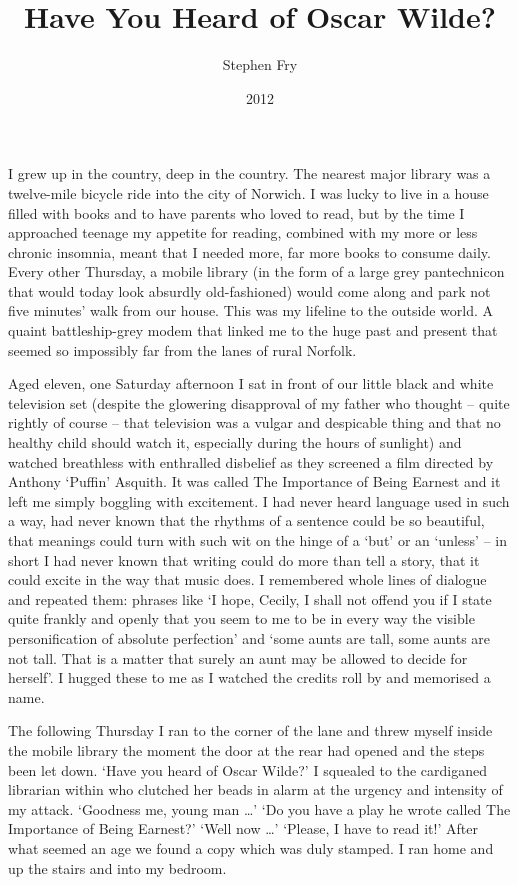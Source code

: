 \documentclass[10pt,a4paper]{article}
\begin{document}
\title{Have You Heard of Oscar Wilde?}
\date{2012}
\author{Stephen Fry}
\maketitle


\linenumbers
I grew up in the country, deep in the country. The nearest major library was a twelve-mile bicycle ride into the city of Norwich. I was lucky to live in a house filled with books and to have parents who loved to read, but by the time I approached teenage my appetite for reading, combined with my more or less chronic insomnia, meant that I needed more, far more books to consume daily. Every other Thursday, a mobile library (in the form of a large grey pantechnicon that would today look absurdly old-fashioned) would come along and park not five minutes’ walk from our house. This was my lifeline to the outside world. A quaint battleship-grey modem that linked me to the huge past and present that seemed so impossibly far from the lanes of rural Norfolk.

Aged eleven, one Saturday afternoon I sat in front of our little black and white television set (despite the glowering disapproval of my father who thought – quite rightly of course – that television was a vulgar and despicable thing and that no healthy child should watch it, especially during the hours of sunlight) and watched breathless with enthralled disbelief as they screened a film directed by Anthony ‘Puffin’ Asquith. It was called The Importance of Being Earnest and it left me simply boggling with excitement. I had never heard language used in such a way, had never known that the rhythms of a sentence could be so beautiful, that meanings could turn with such wit on the hinge of a ‘but’ or an ‘unless’ – in short I had never known that writing could do more than tell a story, that it could excite in the way that music does. I remembered whole lines of dialogue and repeated them: phrases like ‘I hope, Cecily, I shall not offend you if I state quite frankly and openly that you seem to me to be in every way the visible personification of absolute perfection’ and ‘some aunts are tall, some aunts are not tall. That is a matter that surely an aunt may be allowed to decide for herself’. I hugged these to me as I watched the credits roll by and memorised a name.

The following Thursday I ran to the corner of the lane and threw myself inside the mobile library the moment the door at the rear had opened and the steps been let down. ‘Have you heard of Oscar Wilde?’ I squealed to the cardiganed librarian within who clutched her beads in alarm at the urgency and intensity of my attack. ‘Goodness me, young man …’ ‘Do you have a play he wrote called The Importance of Being Earnest?’ ‘Well now …’ ‘Please, I have to read it!’ After what seemed an age we found a copy which was duly stamped. I ran home and up the stairs and into my bedroom.
\end{document}
